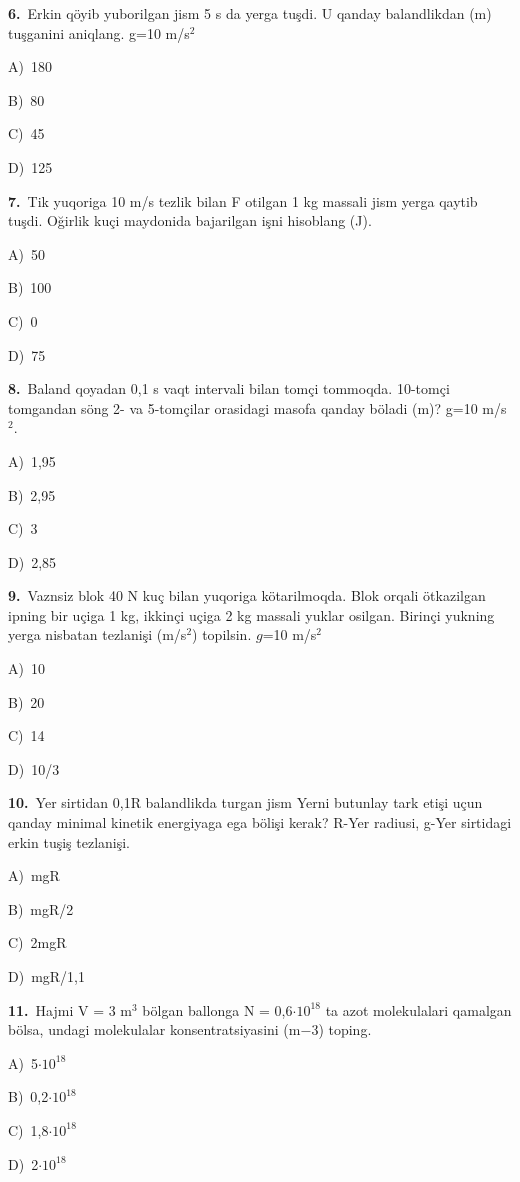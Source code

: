 \documentclass[11pt,a4paper]{article}
\newcommand{\opt}[2]{\hspace*{4mm}#1)\ #2\par}
\begin{document}
\noindent\begin{minipage}{\linewidth}
\textbf{6.}\ Erkin qöyib yuborilgan jism 5 s da yerga tuşdi. U qanday balandlikdan (m) tuşganini aniqlang. g=10 m/s$^{2}$\par\smallskip
\opt{A}{180}
\opt{B}{80}
\opt{C}{45}
\opt{D}{125}
\end{minipage}\vspace{9pt}\par
\noindent\begin{minipage}{\linewidth}
\textbf{7.}\ Tik yuqoriga 10 m/s tezlik bilan F otilgan 1 kg massali jism yerga qaytib tuşdi. Oğirlik kuçi maydonida bajarilgan işni hisoblang (J).\par\smallskip
\opt{A}{50}
\opt{B}{100}
\opt{C}{0}
\opt{D}{75}
\end{minipage}\vspace{9pt}\par
\noindent\begin{minipage}{\linewidth}
\textbf{8.}\ Baland qoyadan 0,1 s vaqt intervali bilan tomçi tommoqda. 10-tomçi tomgandan söng 2- va 5-tomçilar orasidagi masofa qanday böladi (m)? g=10 m/s$^{2}$.\par\smallskip
\opt{A}{1,95}
\opt{B}{2,95}
\opt{C}{3}
\opt{D}{2,85}
\end{minipage}\vspace{9pt}\par
\noindent\begin{minipage}{\linewidth}
\textbf{9.}\ Vaznsiz blok 40 N kuç bilan yuqoriga kötarilmoqda. Blok orqali ötkazilgan ipning bir uçiga 1 kg, ikkinçi uçiga 2 kg massali yuklar osilgan. Birinçi yukning yerga nisbatan tezlanişi (m/s$^{2}$) topilsin. $g$=10 m/s$^{2}$\par\smallskip
\opt{A}{10}
\opt{B}{20}
\opt{C}{14}
\opt{D}{10/3}
\end{minipage}\vspace{9pt}\par
\noindent\begin{minipage}{\linewidth}
\textbf{10.}\ Yer sirtidan 0,1R balandlikda turgan jism Yerni butunlay tark etişi uçun qanday minimal kinetik energiyaga ega bölişi kerak? R-Yer radiusi, g-Yer sirtidagi erkin tuşiş tezlanişi.\par\smallskip
\opt{A}{mgR}
\opt{B}{mgR/2}
\opt{C}{2mgR}
\opt{D}{mgR/1,1}
\end{minipage}\vspace{9pt}\par
\noindent\begin{minipage}{\linewidth}
\textbf{11.}\ Hajmi V = 3 m$^{3}$ bölgan ballonga N = 0,6$\cdot10^{18}$ ta azot molekulalari qamalgan bölsa, undagi molekulalar konsentratsiyasini (m$-$3) toping.\par\smallskip
\opt{A}{5$\cdot10^{18}$}
\opt{B}{0,2$\cdot10^{18}$}
\opt{C}{1,8$\cdot10^{18}$}
\opt{D}{2$\cdot10^{18}$}
\end{minipage}\vspace{9pt}\par
\end{document}
